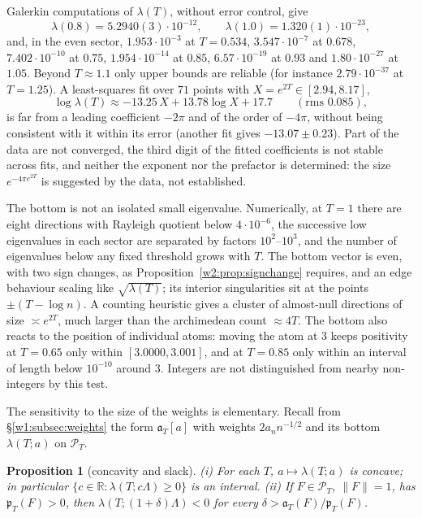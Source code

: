 \documentclass[11pt]{amsart}
\newtheorem{proposition}[theorem]{Proposition}
\theoremstyle{definition}
\theoremstyle{remark}
\numberwithin{equation}{section}
\newcommand{\R}{\mathbb{R}}
\newcommand{\PT}{\mathcal{P}_T}                        %
\newcommand{\pT}{\mathfrak{p}_T}                       %
\newcommand{\aT}{\mathfrak{a}_T}                       %
\newcommand{\lam}{\lambda(T)}                          %
\begin{document}
Galerkin computations of $\lam$, without error control, give
\[
\lambda(0.8)=5.2940(3)\cdot10^{-12},\qquad \lambda(1.0)=1.320(1)\cdot10^{-23},
\]
and, in the even sector, $1.953\cdot10^{-3}$ at $T=0.534$, $3.547\cdot10^{-7}$ at $0.678$, $7.402\cdot10^{-10}$ at $0.75$,
$1.954\cdot10^{-14}$ at $0.85$, $6.57\cdot10^{-19}$ at $0.93$ and $1.80\cdot10^{-27}$ at $1.05$. Beyond $T\approx1.1$
only upper bounds are reliable (for instance $2.79\cdot10^{-37}$ at $T=1.25$). A least-squares fit over $71$
points with $X=e^{2T}\in[2.94,8.17]$,
\[
\log\lam\approx-13.25\,X+13.78\log X+17.7\qquad(\text{rms }0.085),
\]
is far from a leading coefficient $-2\pi$ and of the order of $-4\pi$, without being consistent with it within its
error (another fit gives $-13.07\pm0.23$). Part of the data are not converged, the third digit of the fitted
coefficients is not stable across fits, and neither the exponent nor the prefactor is determined: the size
$e^{-4\pi e^{2T}}$ is suggested by the data, not established.

The bottom is not an isolated small eigenvalue. Numerically, at $T=1$ there are eight directions with Rayleigh
quotient below $4\cdot10^{-6}$, the successive low eigenvalues in each sector are separated by factors $10^2$--$10^3$,
and the number of eigenvalues below any fixed threshold grows with $T$. The bottom vector is even, with two
sign changes, as Proposition~\ref{w2:prop:signchange} requires, and an edge behaviour scaling like $\sqrt{\lam}$; its
interior singularities sit at the points $\pm(T-\log n)$. A counting heuristic gives a cluster of almost-null
directions of size $\asymp e^{2T}$, much larger than the archimedean count $\approx4T$. The bottom also reacts to the
position of individual atoms: moving the atom at $3$ keeps positivity at $T=0.65$ only within $[3.0000,3.001]$, and at
$T=0.85$ only within an interval of length below $10^{-10}$ around $3$. Integers are not distinguished from nearby
non-integers by this test.

The sensitivity to the size of the weights is elementary. Recall from \S\ref{w1:subsec:weights} the form $\aT[a]$ with
weights $2a_nn^{-1/2}$ and its bottom $\lambda(T;a)$ on $\PT$.

\begin{proposition}[concavity and slack]\label{w2:prop:concave}
\emph{(i)} For each $T$, $a\mapsto\lambda(T;a)$ is concave; in particular $\{c\in\R:\lambda(T;c\Lambda)\ge0\}$ is an
interval.
\emph{(ii)} If $F\in\PT$, $\|F\|=1$, has $\pT(F)>0$, then $\lambda(T;(1+\delta)\Lambda)<0$ for every
$\delta>\aT(F)/\pT(F)$.
\end{proposition}
\end{document}
